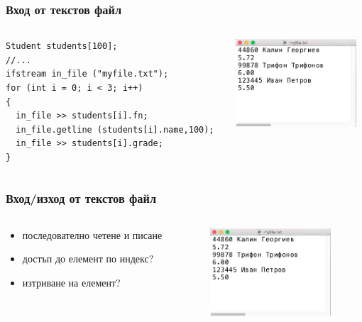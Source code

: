\documentclass{beamer}
\begin{document}
\begin{frame}[fragile]
\frametitle{Вход от текстов файл}



\begin{columns}[t]
  \begin{column}{0.6\textwidth}
      \begin{flushleft}
      \begin{lstlisting}
Student students[100];
//...
ifstream in_file ("myfile.txt");
for (int i = 0; i < 3; i++)
{
  in_file >> students[i].fn;
  in_file.getline (students[i].name,100);
  in_file >> students[i].grade;
}
      \end{lstlisting}
      \end{flushleft} 
  \end{column}
  \begin{column}{0.4\textwidth}

  \includegraphics[width=4.5cm]{images/textedit}
  \end{column}
\end{columns}
\end{frame}




\begin{frame}[fragile]
\frametitle{Вход/изход от текстов файл}



\begin{columns}[t]
  \begin{column}{0.6\textwidth}
      \begin{flushleft}
      \begin{itemize}
        \item последователно четене и писане
        \item достъп до елемент по индекс?
        \item изтриване на елемент?
      \end{itemize}
      \end{flushleft} 
  \end{column}
  \begin{column}{0.4\textwidth}

  \includegraphics[width=4.5cm]{images/textedit}
  \end{column}
\end{columns}
\end{frame}
\end{document}
